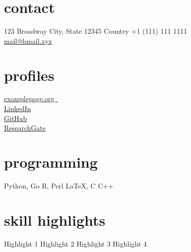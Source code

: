 \documentclass[roboto,custcol]{friggeri-cv}                                       %
\begin{document}

\begin{asidep1}
\section{contact}\vspace{2 mm}
123 Broadway \faMapMarker
City, State 12345
Country
+1 (111) 111 1111 \faPhone\\                                                      %
\href{mailto:foobar@hmail.xyz}{mail@hmail.xyz \faEnvelope}\\\vspace{2 mm}         %
\section{profiles}\vspace{2 mm}
\href{http://examplepage.org/}{examplepage.org~\faFirefox}\\                      %
\href{https://www.linkedin.com/}{LinkedIn \faLinkedin}\\                          %
\href{https://github.com/}{GitHub \faGithub}\\                                    %
\href{https://www.researchgate.net/}{ResearchGate \faUniversity}\\\vspace{2 mm}     %
\section{programming}\vspace{2 mm}
Python, Go
R, Perl
\LaTeX , C
C++\vspace{2 mm}
\section{skill highlights}\vspace{2 mm}
Highlight 1
Highlight 2
Highlight 3
Highlight 4
\end{asidep1}
\end{document}
